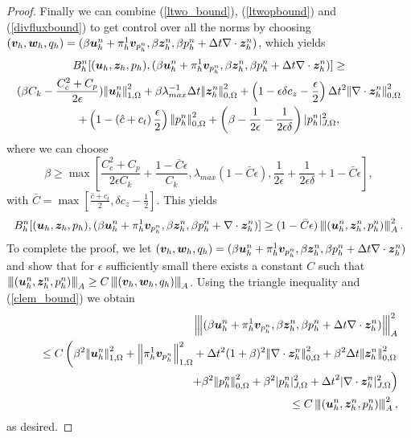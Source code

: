\begin{proof}
 \newline
Finally we can combine (\ref{ltwo_bound}), (\ref{ltwopbound}) and (\ref{divfluxbound}) to get control over all the norms by choosing $\disctripletest=(\beta \dispdiscn + \projscott {\vphn}, \beta \fluxdiscn, \beta \pdiscn +   \Delta t \nabla \cdot \fluxdiscn   )$, which yields
\begin{multline}
  B_{h}^{n}[\disctriple,(\beta \dispdiscn + \projscott {\vphn},  \beta  \fluxdiscn, \beta \pdiscn +  \Delta t \nabla \cdot \fluxdiscn )] \geq  \\ (\beta C_{k}-\frac{C_{c}^{2}+C_{p}}{2\epsilon}) \honenorm{\dispdiscn}^{2}      +  \beta{\lambda_{max}^{-1}} {\Delta t} \ltwonorm{\fluxdiscn}^{2} + \left(1-{\epsilon \delta c_{z}  }-\frac{\epsilon}{2}\right)\Delta t^{2}\ltwonorm{\nabla \cdot \fluxdiscn}^{2}  \\ + \left(1-\left(\hat{c}+c_{t}\right) \frac{\epsilon}{2}\right) \ltwonorm{\pdiscn}^{2} + \left(\beta - \frac{1}{2 \epsilon } - \frac{1}{2 \epsilon \delta} \right) \jnorm{\pdiscn}^{2},
\end{multline}
where we can choose
\begin{equation*}
\beta \geq \max\left[ \frac{C^{2}_{c}+C_{p}}{2 \epsilon C_{k}} + \frac{1 -\bar{C} \epsilon }{ C_{k}}, \lambda_{max}\left( 1 - \bar{C} \epsilon \right),   \frac{1}{2 \epsilon } + \frac{1}{2 \epsilon \delta} +1- \bar{C} \epsilon \right],
\end{equation*}
with $\bar{C}=\max\left[  \frac{\hat{c}+{c}_{t}}{2} , \delta {c}_{z}   -\frac{1}{2} \right] $. This yields
\begin{equation*}
 B_{h}^{n}[\disctriple,(\beta \dispdiscn + \projscott {\vphn}, \beta \fluxdiscn, \beta \pdiscn + \nabla \cdot \fluxdiscn )] \geq  (1- \bar{C}\epsilon) \triplenorm{\disctriplen}^{2}.
\end{equation*}
To complete the proof, we let ${\disctripletest=(\beta \dispdiscn + \projscott {\vphn}, \beta \fluxdiscn, \beta \pdiscn +   \Delta t \nabla \cdot \fluxdiscn   )}$ and show that for $\epsilon$ sufficiently small there exists  a constant $C$ such that $\triplenorm{\disctriplen} \geq C \triplenorm{\disctripletest}$.
Using the triangle inequality and  (\ref{clem_bound}) we obtain
\begin{eqnarray*}
&&\triplenorm{(\beta \dispdiscn + \projscott {\vphn}, \beta \fluxdiscn, \beta \pdiscn + \Delta t\nabla \cdot \fluxdiscn   )}^2 \\
&&\quad \leq C \left( \beta^2\honenorm{\dispdiscn}^2 + \honenorm{\projscott {\vphn}}^2 + \Delta t^2 (1+\beta)^2 \ltwonorm{\nabla \cdot \fluxdiscn}^2 + \beta^2 {\Delta t} \ltwonorm{\fluxdiscn}^2 \right . \\
&&\qquad\qquad \left . + \beta^2\ltwonorm{\pdiscn}^2 + \beta^2 \jnorm{\pdiscn}^2 + {\Delta t}^2 \jnorm{\nabla \cdot \fluxdiscn}^2 \right) \\
&&\quad \leq C \triplenorm{\disctriplen}^2,
\end{eqnarray*}
as desired.
\end{proof}
